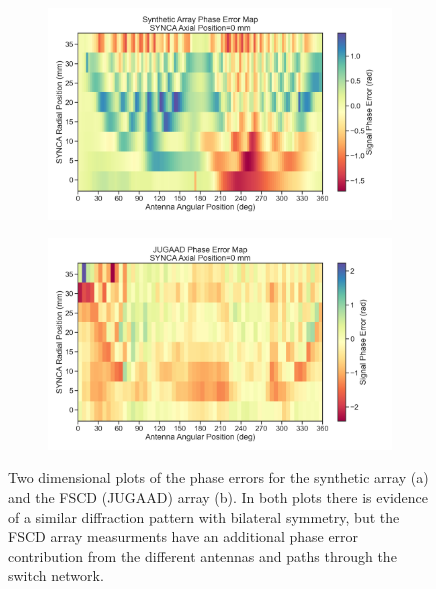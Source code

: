 \begin{figure}[h]
\centering
\begin{subfigure}{.75\textwidth}
  \centering
  \includegraphics[width=1\textwidth]{figs/Chapter-5/230120_synth_array_phase_error_map_z0.png}
  \caption{}
  \label{fig:jugaad_phase_map}
\end{subfigure}
\par\medskip %
\begin{subfigure}{.75\textwidth}
  \centering
  \includegraphics[width=1\textwidth]{figs/Chapter-5/230123_jugaad_phase_error_map_z0.png}
  \caption{}
  \label{fig:synth_jugaad_phase_map}
\end{subfigure}
\caption{Two dimensional plots of the phase errors for the synthetic array (a) and the FSCD (JUGAAD) array (b). In both plots there is evidence of a similar diffraction pattern with bilateral symmetry, but the FSCD array measurments have an additional phase error contribution from the different antennas and paths through the switch network.}
\label{fig:jugaad_measured_phase_maps}
\end{figure}


